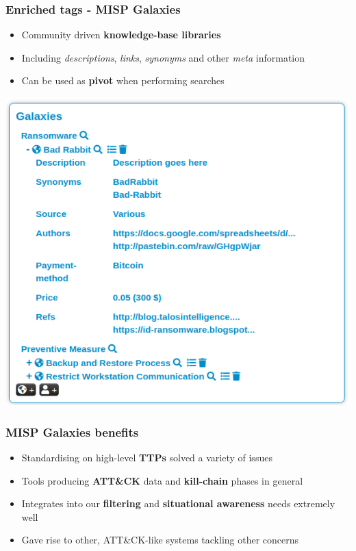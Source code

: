 \begin{frame}
\frametitle{Enriched tags - MISP Galaxies}
    \begin{itemize}
        \item Community driven \textbf{knowledge-base libraries}
        \item Including {\it descriptions}, {\it links}, {\it synonyms} and other {\it meta} information 
        \item Can be used as {\bf pivot} when performing searches
    \end{itemize}
    \begin{center}
        \includegraphics[scale=0.34]{pics/galaxy}
    \end{center}
\end{frame}

\begin{frame}
\frametitle{MISP Galaxies benefits}
    \begin{itemize}
        \item Standardising on high-level {\bf TTPs} solved a variety of issues
        \item Tools producing {\bf ATT\&CK} data and {\bf kill-chain} phases in general
        \item Integrates into our {\bf filtering} and {\bf situational awareness} needs extremely well
        \item Gave rise to other, ATT\&CK-like systems tackling other concerns
    \end{itemize}
\end{frame}

